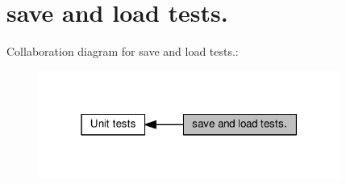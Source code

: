 \hypertarget{group__saveloadtests}{}\section{save and load tests.}
\label{group__saveloadtests}
Collaboration diagram for save and load tests.\+:
\nopagebreak
\begin{figure}[H]
\begin{center}
\leavevmode
\includegraphics[width=280pt]{group__saveloadtests}
\end{center}
\end{figure}
